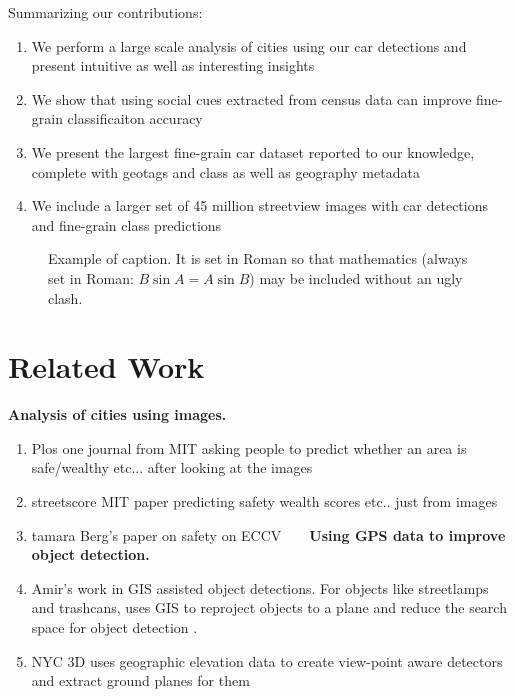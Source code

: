 \documentclass[10pt,twocolumn,letterpaper]{article}
\begin{document}
Summarizing our contributions:
  \begin{enumerate}
    \item We perform a large scale analysis of cities using our car detections and present intuitive as well as interesting insights
    \item We show that using social cues extracted from census data can improve fine-grain classificaiton accuracy
    \item We present the largest fine-grain car dataset reported to our knowledge, complete with geotags and class as well as geography metadata  
    \item We include a larger set of 45 million streetview images with car detections and fine-grain class predictions
  \end{enumerate}


\begin{figure}[t]
\begin{center}
\fbox{\rule{0pt}{2in} \rule{0.9\linewidth}{0pt}}
\end{center}
   \caption{Example of caption.  It is set in Roman so that mathematics
   (always set in Roman: $B \sin A = A \sin B$) may be included without an
   ugly clash.}
\label{fig:data}
\end{figure}
\section{Related Work}
\textbf{Analysis of cities using images.}
  \begin{enumerate}
     \item Plos one journal from MIT asking people to predict whether an area is safe/wealthy etc... after looking at the images
     \item streetscore MIT paper predicting safety wealth scores etc.. just from images~\cite{MIT_vision}
     \item tamara Berg's paper on safety on ECCV
     ~\cite{zhang2014part}
     ~\cite{caltech_birds}
\textbf{Using GPS data to improve object detection.}
     \item Amir's work in GIS assisted object detections. For objects like streetlamps and trashcans, uses GIS to reproject objects to a plane and reduce the search space for object detection .
     \item NYC 3D uses geographic elevation data to create view-point aware detectors and extract ground planes for  them

  \end{enumerate}
\end{document}
